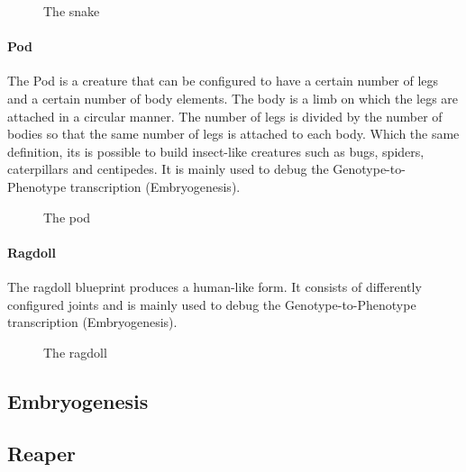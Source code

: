 \documentclass[main]{subfiles}
\begin{document}
\begin{figure}[!h]
\centering
{}
\caption{The snake}
\label{figure:snake}
\end{figure}

\paragraph{Pod}

The Pod is a creature that can be configured to have a certain number of legs and a certain number of body elements. The body is a limb on which the legs are attached in a circular manner. The number of legs is divided by the number of bodies so that the same number of legs is attached to each body. Which the same definition, its is possible to build insect-like creatures such as bugs, spiders, caterpillars and centipedes. It is mainly used to debug the Genotype-to-Phenotype transcription (Embryogenesis).

\begin{figure}[!h]
\centering
{}
\caption{The pod}
\label{figure:pod}
\end{figure}

\paragraph{Ragdoll}

The ragdoll blueprint produces a human-like form. It consists of differently configured joints and is mainly used to debug the Genotype-to-Phenotype transcription (Embryogenesis).

\begin{figure}[!h]
\centering
{}
\caption{The ragdoll}
\label{figure:ragdoll}
\end{figure}

\subsection{Embryogenesis}

\lipsum[13]

\subsection{Reaper}
\label{subsection:Reaper}

\lipsum[13]
\end{document}
